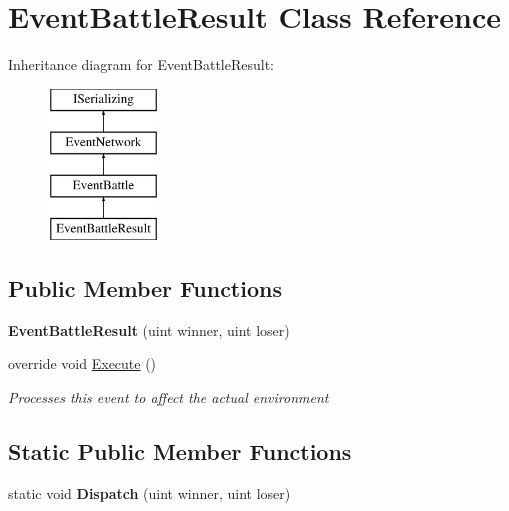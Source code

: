 \hypertarget{class_event_battle_result}{\section{Event\-Battle\-Result Class Reference}
\label{class_event_battle_result}
}
Inheritance diagram for Event\-Battle\-Result\-:\begin{figure}[H]
\begin{center}
\leavevmode
\includegraphics[height=4.000000cm]{class_event_battle_result}
\end{center}
\end{figure}
\subsection*{Public Member Functions}
\begin{DoxyCompactItemize}
\item 
\hypertarget{class_event_battle_result_a4b78976edd27a53d4cdc0edfdafbb1ec}{{\bfseries Event\-Battle\-Result} (uint winner, uint loser)}\label{class_event_battle_result_a4b78976edd27a53d4cdc0edfdafbb1ec}

\item 
override void \hyperlink{class_event_battle_result_ae2c6d5e3e01daef4de97df2e481fcac5}{Execute} ()
\begin{DoxyCompactList}\small\item\em Processes this event to affect the actual environment \end{DoxyCompactList}\end{DoxyCompactItemize}
\subsection*{Static Public Member Functions}
\begin{DoxyCompactItemize}
\item 
\hypertarget{class_event_battle_result_a3a883cf09097dbff948b90a9644b1b04}{static void {\bfseries Dispatch} (uint winner, uint loser)}\label{class_event_battle_result_a3a883cf09097dbff948b90a9644b1b04}

\end{DoxyCompactItemize}
